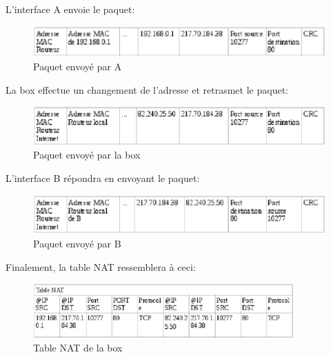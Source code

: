 L'interface A envoie le paquet:
\begin{figure}[h]
\centering
\includegraphics[width=12cm]{./pics/PaquetAR.eps}
\caption{Paquet envoyé par A}
\label{fig:paquetAR}
\end{figure}

\newpage

La box effectue un changement de l'adresse et retrasmet le paquet:
\begin{figure}[h]
\centering
\includegraphics[width=12cm]{./pics/PaquetRB.eps}
\caption{Paquet envoyé par la box}
\label{fig:paquetRB}
\end{figure}


L'interface B répondra en envoyant le paquet:
\begin{figure}[h]
\centering
\includegraphics[width=12cm]{./pics/PaquetBR.eps}
\caption{Paquet envoyé par B}
\label{fig:paquetBR}
\end{figure}
\smallbreak
Finalement, la table NAT ressemblera à ceci:

\begin{figure}[h]
\centering
\includegraphics[width=10cm]{./pics/TableNAT1.eps}
\caption{Table NAT de la box}
\label{fig:NAT1}
\end{figure}

